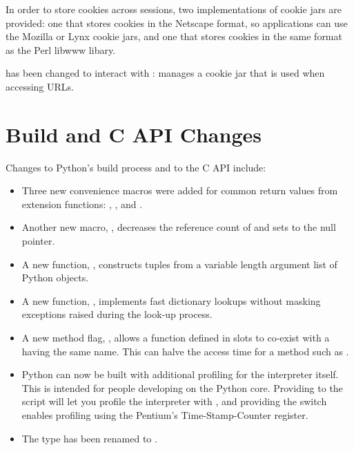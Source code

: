 \documentclass{howto}
\begin{document}
In order to store cookies across sessions, two implementations of
cookie jars are provided: one that stores cookies in the Netscape
format, so applications can use the Mozilla or Lynx cookie jars, and
one that stores cookies in the same format as the Perl libwww libary.

 has been changed to interact with :
 manages a cookie jar that is used when
accessing URLs.

\section{Build and C API Changes}

Changes to Python's build process and to the C API include:

\begin{itemize}

  \item Three new convenience macros were added for common return
  values from extension functions: ,
  , and .

  \item Another new macro, , 
  decreases the reference count of  and sets  to the
  null pointer.

  \item A new function, , constructs tuples from a variable
  length argument list of Python objects.

  \item A new function, ,
  implements fast dictionary lookups without masking exceptions raised
  during the look-up process.

  \item A new method flag, , allows a function
  defined in slots to co-exist with a  having the
  same name.  This can halve the access time for a method such as
  .

  \item Python can now be built with additional profiling for the interpreter
   itself.  This is intended for people developing on the Python core.  
   Providing  to the  
    script will let you profile the interpreter with 
   , and providing the  switch 
   enables profiling using the Pentium's Time-Stamp-Counter register.

  \item The  type has been renamed to .

\end{itemize}
\end{document}
